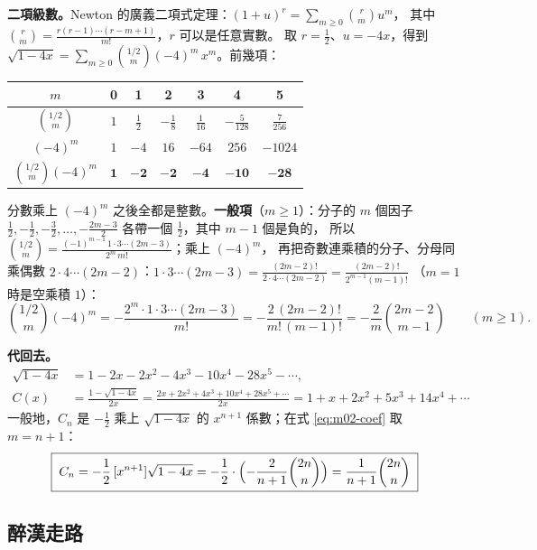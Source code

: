 \medskip
\textbf{二項級數。}Newton 的廣義二項式定理：$(1+u)^r=\sum_{m\ge0}\binom{r}{m}u^m$，
其中 $\binom{r}{m}=\frac{r(r-1)\cdots(r-m+1)}{m!}$，$r$ 可以是任意實數。
取 $r=\frac12$、$u=-4x$，得到 $\sqrt{1-4x}=\sum_{m\ge0}\binom{1/2}{m}(-4)^m\,x^m$。前幾項：
\begin{center}
\small
\renewcommand{\arraystretch}{1.2}
\begin{tabular}{@{}c|cccccc@{}}
$m$ & 0 & 1 & 2 & 3 & 4 & 5\\
\hline
$\binom{1/2}{m}$ & $1$ & $\frac12$ & $-\frac18$ & $\frac1{16}$ & $-\frac5{128}$ & $\frac7{256}$\\
$(-4)^m$ & $1$ & $-4$ & $16$ & $-64$ & $256$ & $-1024$\\
\hline
$\binom{1/2}{m}(-4)^m$ & $\mathbf{1}$ & $\mathbf{-2}$ & $\mathbf{-2}$ & $\mathbf{-4}$ & $\mathbf{-10}$ & $\mathbf{-28}$
\end{tabular}
\end{center}
分數乘上 $(-4)^m$ 之後全都是整數。\textbf{一般項}（$m\ge1$）：分子的 $m$ 個因子
$\frac12,-\frac12,-\frac32,\ldots,-\frac{2m-3}{2}$ 各帶一個 $\frac12$，其中 $m-1$ 個是負的，
所以 $\binom{1/2}{m}=\frac{(-1)^{m-1}\,1\cdot3\cdots(2m-3)}{2^m\,m!}$；乘上 $(-4)^m$，
再把奇數連乘積的分子、分母同乘偶數 $2\cdot4\cdots(2m-2)$：$1\cdot3\cdots(2m-3)=\frac{(2m-2)!}{2\cdot4\cdots(2m-2)}=\frac{(2m-2)!}{2^{m-1}(m-1)!}$
（$m=1$ 時是空乘積 $1$）：
\begin{equation}\label{eq:m02-coef}
\binom{1/2}{m}(-4)^m=-\frac{2^m\cdot1\cdot3\cdots(2m-3)}{m!}=-\frac{2\,(2m-2)!}{m!\,(m-1)!}
=-\frac{2}{m}\binom{2m-2}{m-1}\qquad(m\ge1).
\end{equation}

\textbf{代回去。}
\begin{align*}
\sqrt{1-4x}&=1-2x-2x^2-4x^3-10x^4-28x^5-\cdots,\\
C(x)&=\frac{1-\sqrt{1-4x}}{2x}=\frac{2x+2x^2+4x^3+10x^4+28x^5+\cdots}{2x}=1+x+2x^2+5x^3+14x^4+\cdots
\end{align*}
一般地，$C_n$ 是 $-\frac12$ 乘上 $\sqrt{1-4x}$ 的 $x^{n+1}$ 係數；在式 \eqref{eq:m02-coef} 取 $m=n+1$：
\[
\boxed{\;C_n=-\frac12\,[x^{n+1}]\sqrt{1-4x}=-\frac12\cdot\Bigl(-\frac{2}{n+1}\binom{2n}{n}\Bigr)=\frac{1}{n+1}\binom{2n}{n}\;}
\]

\subsection{醉漢走路}\label{sec:m03}

